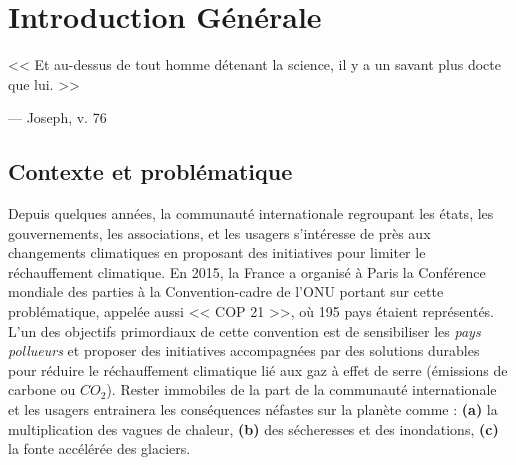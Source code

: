 \chapter{Introduction Générale}
\label{chap1} 

\epigraph{<< Et au-dessus de tout homme détenant la science, il y a un savant plus docte que lui. >>}{--- \textup{Joseph, v. 76}}

\NoChapterPrefix \NoChapterNumberInRef {\hypersetup{linkcolor=black} \minitoc}

\makeatletter
\renewcommand{\thefigure}{\ifnum \c@section>\z@ \thechapter.\fi
 \@arabic\c@figure}
\makeatother

\makeatletter
\renewcommand{\thetable}{\ifnum \c@section>\z@ \thechapter.\fi
 \@arabic\c@table}
\makeatother

\makeatletter
\renewcommand{\theequation}{\ifnum \c@section>\z@ \thechapter.\fi
 \@arabic\c@equation}
\makeatother

\newpage
\section{Contexte et problématique}
Depuis quelques années, la communauté internationale regroupant les états, les gouvernements, les associations, et les usagers s'intéresse de près  aux changements climatiques en proposant des initiatives pour limiter le réchauffement climatique. En 2015, la France a organisé à Paris la Conférence mondiale des parties à la Convention-cadre de l'ONU portant sur cette problématique, appelée aussi << COP 21 >>, où 195 pays étaient représentés. L'un des objectifs primordiaux  de cette convention est de sensibiliser les \textit{pays pollueurs} et proposer des initiatives accompagnées par des solutions durables pour réduire le réchauffement climatique lié aux gaz à effet de serre (émissions de carbone ou $CO_2$). Rester immobiles de la part de la communauté internationale et les usagers  entrainera les conséquences néfastes sur la planète comme :  \textbf{(a)} la multiplication des vagues de chaleur, \textbf{(b)} des sécheresses et des inondations, \textbf{(c)} la fonte accélérée des glaciers. 

